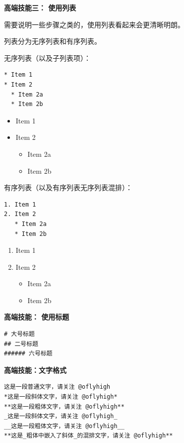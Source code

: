 \documentclass[]{ctexbook}
\providecommand{\tightlist}{%
  \setlength{\itemsep}{0pt}\setlength{\parskip}{0pt}}
\begin{document}
\textbf{高端技能三： 使用列表}

需要说明一些步骤之类的，使用列表看起来会更清晰明朗。

列表分为无序列表和有序列表。

无序列表（以及子列表项）：

\begin{verbatim}
* Item 1
* Item 2
  * Item 2a
  * Item 2b
\end{verbatim}

\begin{itemize}
\tightlist
\item
  Item 1
\item
  Item 2

  \begin{itemize}
  \tightlist
  \item
    Item 2a
  \item
    Item 2b
  \end{itemize}
\end{itemize}

有序列表（以及有序列表无序列表混排）：

\begin{verbatim}
1. Item 1
2. Item 2
   * Item 2a
   * Item 2b
\end{verbatim}

\begin{enumerate}
\def\labelenumi{\arabic{enumi}.}
\tightlist
\item
  Item 1
\item
  Item 2

  \begin{itemize}
  \tightlist
  \item
    Item 2a
  \item
    Item 2b
  \end{itemize}
\end{enumerate}

\textbf{高端技能： 使用标题}

\begin{verbatim}
# 大号标题
## 二号标题
###### 六号标题
\end{verbatim}

\textbf{高端技能：文字格式}

\begin{verbatim}
这是一段普通文字，请关注 @oflyhigh
*这是一段斜体文字，请关注 @oflyhigh*
**这是一段粗体文字，请关注 @oflyhigh**
_这是一段斜体文字，请关注 @oflyhigh_
__这是一段粗体文字，请关注 @oflyhigh__
**这是_粗体中嵌入了斜体_的混排文字，请关注 @oflyhigh**
\end{verbatim}
\end{document}
